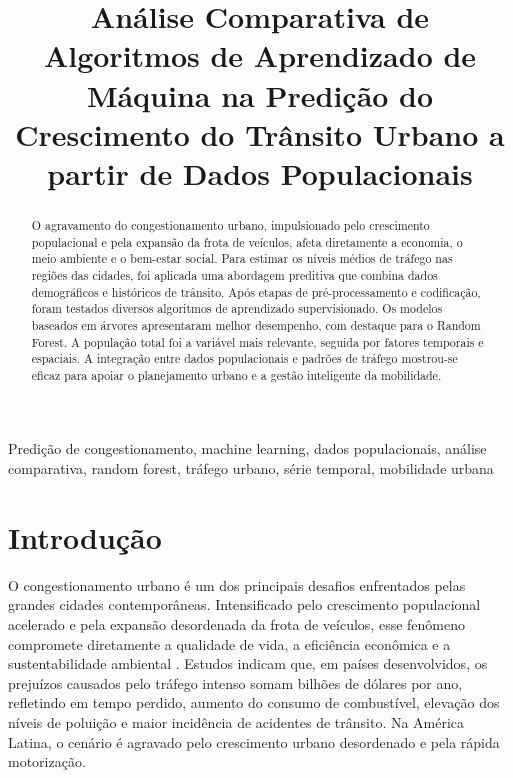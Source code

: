 \documentclass[conference]{IEEEtran}
\begin{document}
\title{Análise Comparativa de Algoritmos de Aprendizado de Máquina na Predição do Crescimento do Trânsito Urbano a partir de Dados Populacionais\\
}

\author{
}


\maketitle

\begin{abstract}
O agravamento do congestionamento urbano, impulsionado pelo crescimento populacional e pela expansão da frota de veículos, afeta diretamente a economia, o meio ambiente e o bem-estar social. Para estimar os níveis médios de tráfego nas regiões das cidades, foi aplicada uma abordagem preditiva que combina dados demográficos e históricos de trânsito. Após etapas de pré-processamento e codificação, foram testados diversos algoritmos de aprendizado supervisionado. Os modelos baseados em árvores apresentaram melhor desempenho, com destaque para o Random Forest. A população total foi a variável mais relevante, seguida por fatores temporais e espaciais. A integração entre dados populacionais e padrões de tráfego mostrou-se eficaz para apoiar o planejamento urbano e a gestão inteligente da mobilidade.
\end{abstract}

\begin{IEEEkeywords}
Predição de congestionamento, machine learning, dados populacionais, 
análise comparativa, random forest, tráfego urbano, série temporal, 
mobilidade urbana
\end{IEEEkeywords}

\section{Introdução}
O congestionamento urbano é um dos principais desafios enfrentados pelas grandes cidades contemporâneas. Intensificado pelo crescimento populacional acelerado e pela expansão desordenada da frota de veículos, esse fenômeno compromete diretamente a qualidade de vida, a eficiência econômica e a sustentabilidade ambiental \cite{1}. Estudos indicam que, em países desenvolvidos, os prejuízos causados pelo tráfego intenso somam bilhões de dólares por ano, refletindo em tempo perdido, aumento do consumo de combustível, elevação dos níveis de poluição e maior incidência de acidentes de trânsito. Na América Latina, o cenário é agravado pelo crescimento urbano desordenado e pela rápida motorização.
\end{document}
